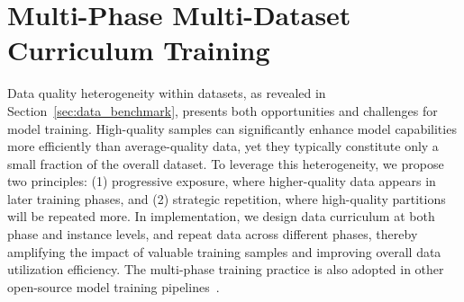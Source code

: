 \section{Multi-Phase Multi-Dataset Curriculum Training}
\label{sec:multi_phase_curriculum}

Data quality heterogeneity within datasets, as revealed in Section~\ref{sec:data_benchmark}, presents both opportunities and challenges for model training. High-quality samples can significantly enhance model capabilities more efficiently than average-quality data, yet they typically constitute only a small fraction of the overall dataset. To leverage this heterogeneity, we propose two principles: (1) progressive exposure, where higher-quality data appears in later training phases, and (2) strategic repetition, where high-quality partitions will be repeated more. In implementation, we design data curriculum at both phase and instance levels, and repeat data across different phases, thereby amplifying the impact of valuable training samples and improving overall data utilization efficiency. The multi-phase training practice is also adopted in other open-source model training pipelines~\citep {smol2,hu2024yulan}.

\begin{table}[t]
\centering
\caption{Performance Comparison: Selective Repetition and Curriculum Learning Strategies.}
\label{tab:curriculum_comparison}
\end{table}

